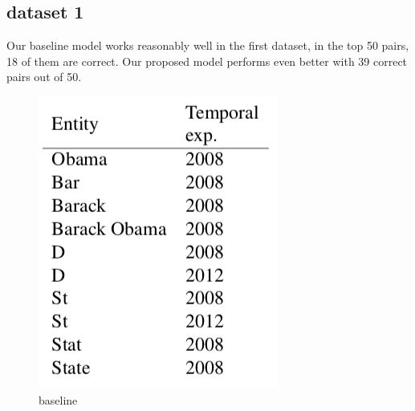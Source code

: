 \documentclass[12pt,a4paper]{article}
\begin{document}
\subsection{dataset 1}
Our baseline model works reasonably well in the first dataset, in the top 50 pairs, 18 of them are correct. Our proposed model performs even better with 39 correct pairs out of 50. 
\begin{figure}[htbp]
\begin{minipage}[t]{0.45\linewidth}
    \includegraphics[width=\linewidth]{base_set1}
    \caption{baseline}
\end{minipage}%
    \hfill%
\begin{minipage}[t]{0.45\linewidth}

\end{minipage}
\end{figure}
\end{document}
